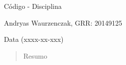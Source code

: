 \begin{titlepage}
\\

\vspace{7.5cm}

\\


\vspace{3cm}

Código - Disciplina

\vspace{2cm}

Andryas Waurzenczak, GRR: 20149125 \\

\vfill

Data (xxxx-xx-xxx)
\end{titlepage}


\begin{abstract}
Resumo
\end{abstract}


\pagebreak
\tableofcontents
\pagebreak


